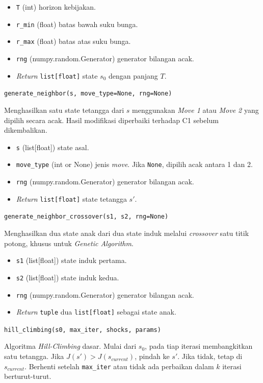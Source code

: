 \begin{itemize}
    \item \texttt{T} (int) horizon kebijakan.
    \item \texttt{r\_min} (float) batas bawah suku bunga.
    \item \texttt{r\_max} (float) batas atas suku bunga.
    \item \texttt{rng} (numpy.random.Generator) generator bilangan acak.
    \item \textit{Return} \texttt{list[float]} state $s_0$ dengan panjang $T$.
\end{itemize}

\texttt{generate\_neighbor(s, move\_type=None, rng=None)}

Menghasilkan satu state tetangga dari $s$ menggunakan \textit{Move 1} atau \textit{Move 2} yang dipilih secara acak. Hasil modifikasi diperbaiki terhadap C1 sebelum dikembalikan.

\begin{itemize}
    \item \texttt{s} (list[float]) state asal.
    \item \texttt{move\_type} (int or None) jenis \textit{move}. Jika \texttt{None}, dipilih acak antara 1 dan 2.
    \item \texttt{rng} (numpy.random.Generator) generator bilangan acak.
    \item \textit{Return} \texttt{list[float]} state tetangga $s'$.
\end{itemize}

\texttt{generate\_neighbor\_crossover(s1, s2, rng=None)}

Menghasilkan dua state anak dari dua state induk melalui \textit{crossover} satu titik potong, khusus untuk \textit{Genetic Algorithm}.

\begin{itemize}
    \item \texttt{s1} (list[float]) state induk pertama.
    \item \texttt{s2} (list[float]) state induk kedua.
    \item \texttt{rng} (numpy.random.Generator) generator bilangan acak.
    \item \textit{Return} \texttt{tuple} dua \texttt{list[float]} sebagai state anak.
\end{itemize}

\texttt{hill\_climbing(s0, max\_iter, shocks, params)}

Algoritma \textit{Hill-Climbing} dasar. Mulai dari $s_0$, pada tiap iterasi membangkitkan satu tetangga. Jika $J(s') > J(s_{current})$, pindah ke $s'$. Jika tidak, tetap di $s_{current}$. Berhenti setelah \texttt{max\_iter} atau tidak ada perbaikan dalam $k$ iterasi berturut-turut.

